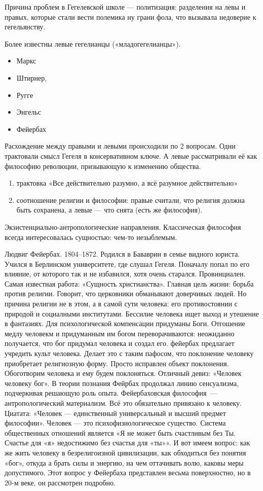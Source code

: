 Причина проблем в Гегелевской школе --- политизация: разделения на левы и правых, которые стали вести полемика ну грани фола, что вызывала недоверие к гегельянству. 

Более известны левые гегелианцы («младогегелианцы»).
\begin{itemize}
	\item Маркс 
	\item Штирнер, 
	\item Ругге
	\item Энгельс
	\item Фейербах
\end{itemize}

Расхождение между правыми и левыми происходили по 2 вопросам. Одни трактовали смысл Гегеля в консервативном ключе. А левые рассматривали её как философию революции, призывающую к изменению общества. 
\begin{enumerate}
	\item трактовка «Все действительно разумно, а всё разумное действительно»
	\item соотношение религии и философии: правые считали, что религия должна быть сохранена, а левые --- что снята (есть же философия).
\end{enumerate}

Экзистенциально-антропологические направления.
Классическая философия всегда интересовалась сущностью: чем-то незыблемым.

Людвиг Фейербах. 1804--1872. Родился в Бававрии в семье видного юриста. Учился в Берлинском университете, где слушал Гегеля. Поначалу попал по его влияние, от которого так и не избавился, хотя очень старался. 
Провинциален. Самая известная работа: «Сущность христианства».
Главная цель жизни: борьба против религии.
Говорит, что церковники обманывают доверчивых людей. Но причина религии не в этом, а в самой сути человека: его противостоянии с природой и социалными институтами. Бессилие человека ищет выход и утешение в фантазиях. Для психологической компенсации придуманы Боги. Отгошение медлу человекм и придуманным им богом переворачиваются: неожиданно получается, что бог придумал человека и создал его. 
фейербах предлагает учредить культ человека. Делает это с таким пафосом, что поклонение человеку приобретает религиозную форму. Просто исправлен объект поклонения. Обоготворим человека и ему будем поклоняться. Отличный девиз: «Человек человеку бог». В теории познания Фейрбах продолжал линию сенсуализма, подчеркивая решающую роль опыта. Фейербаховская философия~--- антропологический материализм. Всё это обязательно привязано к человеку. Циатата: «Человек --- единственный универсальный и высший предмет философии». Человек --- это психофизиологическое существо. Система общественных отношений является «Я не может быть счастливым без Ты. Счастье для «я» недостижимо без счастья для «ты»». И вот имеем вопрос: как же жить человеку в безрелигоизной цивилизации, как обходиться без понятия «бог», откуда а брать силы и энергию, на чем оттачивать волю, каковы меры допустимого. Этот вопрос у Фейербаха представлен весьма поверхностно, но в 20-м веке, он рассмотрен подробно.